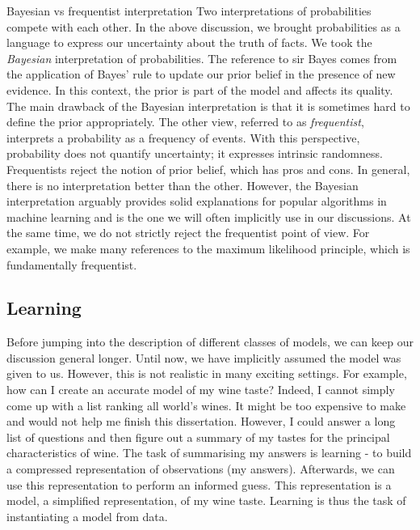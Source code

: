 \begin{side_note}{Bayesian vs frequentist interpretation}
  Two interpretations of probabilities compete with each other. In the above discussion, we brought probabilities as a language to express our uncertainty about the truth of facts. We took the \textit{Bayesian} interpretation of probabilities. The reference to sir Bayes comes from the application of Bayes' rule to update our prior belief in the presence of new evidence. In this context, the prior is part of the model and affects its quality. The main drawback of the Bayesian interpretation is that it is sometimes hard to define the prior appropriately. The other view, referred to as \textit{frequentist}, interprets a probability as a frequency of events. With this perspective, probability does not quantify uncertainty; it expresses intrinsic randomness. Frequentists reject the notion of prior belief, which has pros and cons. In general, there is no interpretation better than the other. However, the Bayesian interpretation arguably provides solid explanations for popular algorithms in machine learning and is the one we will often implicitly use in our discussions. At the same time, we do not strictly reject the frequentist point of view. For example, we make many references to the maximum likelihood principle, which is fundamentally frequentist.
\end{side_note}
%

\subsection{Learning}
Before jumping into the description of different classes of models, we can keep our discussion general longer.
Until now, we have implicitly assumed the model was given to us. However, this is not realistic in many exciting settings. For example, how can I create an accurate model of my wine taste? Indeed, I cannot simply come up with a list ranking all world's wines. It might be too expensive to make and would not help me finish this dissertation. However, I could answer a long list of questions and then figure out a summary of my tastes for the principal characteristics of wine. The task of summarising my answers is learning - to build a compressed representation of observations (my answers). Afterwards, we can use this representation to perform an informed guess. This representation is a model, a simplified representation, of my wine taste. Learning is thus the task of instantiating a model from data.


